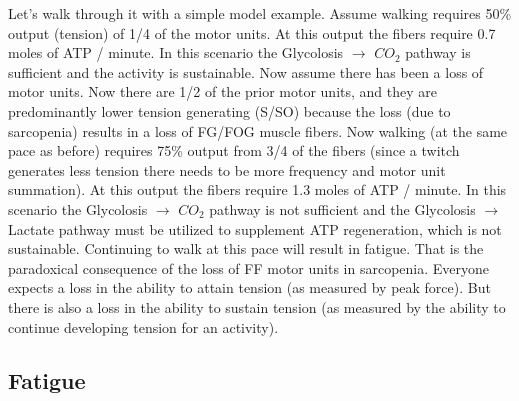 Let's walk through it with a simple model example. Assume walking requires 50\% output (tension) of 1/4 of the motor units. At this output the fibers require 0.7 moles of ATP / minute. In this scenario the Glycolosis $\rightarrow$ $CO_2$ pathway is sufficient and the activity is sustainable. Now assume there has been a loss of motor units. Now there are 1/2 of the prior motor units, and they are predominantly lower tension generating (S/SO) because the loss (due to sarcopenia) results in a loss of FG/FOG muscle fibers. Now walking (at the same pace as before) requires 75\% output from 3/4 of the fibers (since a twitch generates less tension there needs to be more frequency and motor unit summation). At this output the fibers require 1.3 moles of ATP / minute. In this scenario the Glycolosis $\rightarrow$ $CO_2$ pathway is not sufficient and the Glycolosis $\rightarrow$ Lactate pathway must be utilized to supplement ATP regeneration, which is not sustainable. Continuing to walk at this pace will result in fatigue. That is the paradoxical consequence of the loss of FF motor units in sarcopenia. Everyone expects a loss in the ability to attain tension (as measured by peak force). But there is also a loss in the ability to sustain tension (as measured by the ability to continue developing tension for an activity).


\subsection{Fatigue}




